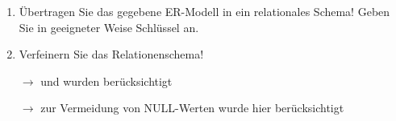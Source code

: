 \documentclass{lehramt-informatik-aufgabe}
\begin{document}
\begin{enumerate}


\item Übertragen Sie das gegebene ER-Modell in ein
relationales Schema! Geben Sie in geeigneter Weise Schlüssel an.

\begin{liAntwort}
\begin{liRmodell}
\end{liRmodell}
\end{liAntwort}


\item Verfeinern Sie das Relationenschema!

\begin{liAntwort}
\begin{liRmodell}
\end{liRmodell}

$\rightarrow$  und  wurden
berücksichtigt

\begin{liRmodell}
\end{liRmodell}

$\rightarrow$ zur Vermeidung von NULL-Werten wurde hier
 berücksichtigt

\begin{liRmodell}
\end{liRmodell}
\end{liAntwort}
\end{enumerate}
\end{document}
